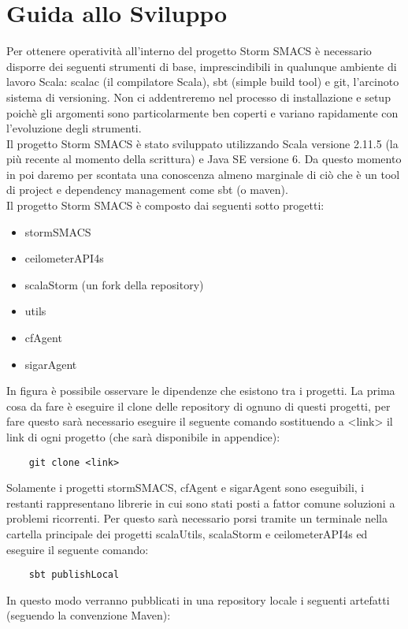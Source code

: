 \documentclass[12pt]{article}
\begin{document}
\section{Guida allo Sviluppo}
Per ottenere operativit\`a all'interno del progetto Storm SMACS \`e necessario disporre dei seguenti strumenti di base, imprescindibili in qualunque ambiente di lavoro Scala: scalac (il compilatore Scala), sbt (simple build tool) e git, l'arcinoto sistema di versioning. Non ci addentreremo nel processo di installazione e setup poich\`e gli argomenti sono particolarmente ben coperti e variano rapidamente con l'evoluzione degli strumenti.\\
Il progetto Storm SMACS \`e stato sviluppato utilizzando Scala versione 2.11.5 (la pi\`u recente al momento della scrittura) e Java SE versione 6.
Da questo momento in poi daremo per scontata una conoscenza almeno marginale di ci\`o che \`e un tool di project e dependency management come sbt (o maven).\\
Il progetto Storm SMACS \`e composto dai seguenti sotto progetti:\\
\begin{itemize}
\item stormSMACS
\item ceilometerAPI4s
\item scalaStorm (un fork della repository)
\item utils
\item cfAgent
\item sigarAgent
\end{itemize}
In figura \`e possibile osservare le dipendenze che esistono tra i progetti.
La prima cosa da fare \`e eseguire il clone delle repository di ognuno di questi progetti, per fare questo sar\`a necessario eseguire 	il seguente comando sostituendo a <link> il link di ogni progetto (che sar\`a disponibile in appendice):
\begin{lstlisting}
	git clone <link>
\end{lstlisting}
Solamente i progetti stormSMACS, cfAgent e sigarAgent sono eseguibili, i restanti rappresentano librerie in cui sono stati posti a fattor comune soluzioni a problemi ricorrenti.
Per questo sar\`a necessario porsi tramite un terminale nella cartella principale dei progetti scalaUtils, scalaStorm e ceilometerAPI4s ed eseguire il seguente comando:
\begin{lstlisting}
	sbt publishLocal
\end{lstlisting}
In questo modo verranno pubblicati in una repository locale i seguenti artefatti (seguendo la convenzione Maven):
\end{document}
